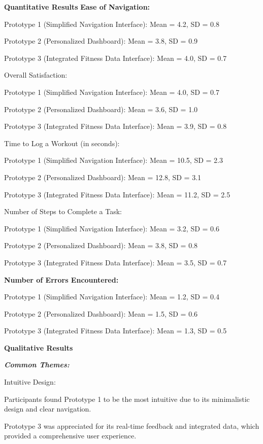\documentclass[
	letterpaper, %
]{jdf}
\begin{document}
 

\textbf{Quantitative Results
}
\textbf{Ease of Navigation:
}
 

Prototype 1 (Simplified Navigation Interface): Mean = 4.2, SD = 0.8

Prototype 2 (Personalized Dashboard): Mean = 3.8, SD = 0.9

Prototype 3 (Integrated Fitness Data Interface): Mean = 4.0, SD = 0.7

Overall Satisfaction:

 

Prototype 1 (Simplified Navigation Interface): Mean = 4.0, SD = 0.7

Prototype 2 (Personalized Dashboard): Mean = 3.6, SD = 1.0

Prototype 3 (Integrated Fitness Data Interface): Mean = 3.9, SD = 0.8

Time to Log a Workout (in seconds):

 

Prototype 1 (Simplified Navigation Interface): Mean = 10.5, SD = 2.3

Prototype 2 (Personalized Dashboard): Mean = 12.8, SD = 3.1

Prototype 3 (Integrated Fitness Data Interface): Mean = 11.2, SD = 2.5

Number of Steps to Complete a Task:

 

Prototype 1 (Simplified Navigation Interface): Mean = 3.2, SD = 0.6

Prototype 2 (Personalized Dashboard): Mean = 3.8, SD = 0.8

Prototype 3 (Integrated Fitness Data Interface): Mean = 3.5, SD = 0.7

\textbf{Number of Errors Encountered:
}
 

Prototype 1 (Simplified Navigation Interface): Mean = 1.2, SD = 0.4

Prototype 2 (Personalized Dashboard): Mean = 1.5, SD = 0.6

Prototype 3 (Integrated Fitness Data Interface): Mean = 1.3, SD = 0.5

\textbf{Qualitative Results}

\textbf{\textit{Common Themes:
}}
 

Intuitive Design:

Participants found Prototype 1 to be the most intuitive due to its minimalistic design and clear navigation.

Prototype 3 was appreciated for its real-time feedback and integrated data, which provided a comprehensive user experience.
\end{document}
